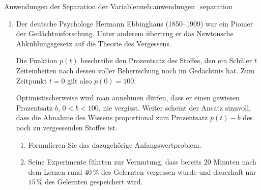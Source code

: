 \begin{ueb}{Anwendungen der Separation der Variablen}{ueb:anwendungen_separation}
\begin{enumerate}
\begin{enumerate}[label=\alph*)]
                  \item Wie viel Salz ist nach einer Stunde
                        noch vorhanden?

                  \item Wann beträgt der Salzgehalt nur noch
                        \qty{10}{\gram}?

                  \item Wie verändert sich die Differentialgleichung,
                        wenn das einfliessende Wasser eine
                        Salzkonzentration von
                        \qty{0.01}{\gram\per\centi\meter\cubed}
                        aufweist?

                  \item Lösen Sie die veränderte Differentialgleichung
                        mit der Anfangsbedingung \(s(0)=50\)
                        und berechnen Sie
                        \[
                            \lim_{t\to\infty}s(t).
                        \]
              \end{enumerate}

        \item Der deutsche Psychologe Hermann Ebbinghaus
              (1850--1909) war ein Pionier der Gedächtnisforschung.
              Unter anderem übertrug er das Newtonsche
              Abkühlungsgesetz auf die Theorie des Vergessens.

              Die Funktion \(p(t)\) beschreibe den Prozentsatz
              des Stoffes, den ein Schüler \(t\) Zeiteinheiten
              nach dessen voller Beherrschung noch im Gedächtnis
              hat. Zum Zeitpunkt \(t=0\) gilt also \(p(0)=100\).

              Optimistischerweise wird man annehmen dürfen,
              dass er einen gewissen Prozentsatz \(b\),
              \(0<b<100\), nie vergisst.
              Weiter scheint der Ansatz sinnvoll, dass die
              Abnahme des Wissens proportional zum Prozentsatz
              \(p(t)-b\) des noch zu vergessenden Stoffes ist.

              \begin{enumerate}[label=\alph*)]
                  \item Formulieren Sie das dazugehörige
                        Anfangswertproblem.

                  \item Seine Experimente führten zur Vermutung,
                        dass bereits 20 Minuten nach dem Lernen
                        rund \(40\,\%\) des Gelernten vergessen
                        wurde und dauerhaft nur \(15\,\%\)
                        des Gelernten gespeichert wird.


\end{enumerate}
\end{enumerate}
\end{ueb}
